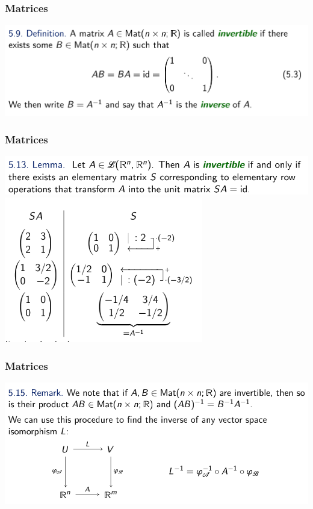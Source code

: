 \documentclass[12pt, t]{beamer}
\begin{document}
\begin{frame}
    \frametitle{Matrices}
    \begin{center}
        \includegraphics[width=\textwidth]{7}
    \end{center}
\end{frame}
\begin{frame}
    \frametitle{Matrices}
    \begin{center}
        \includegraphics[width=\textwidth]{8}
         \includegraphics[width=0.65\textwidth]{9}
    \end{center}
\end{frame}
\begin{frame}
    \frametitle{Matrices} 
    \begin{center}
        \includegraphics[width=\textwidth]{10}
    \end{center}
\end{frame}
\end{document}
